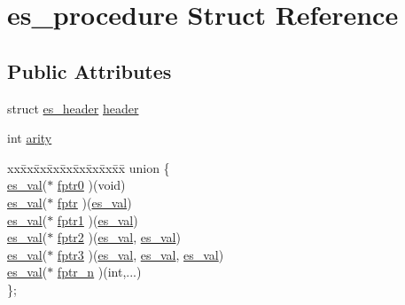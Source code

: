 \hypertarget{structes__procedure}{\section{es\-\_\-procedure Struct Reference}
\label{structes__procedure}
}
\subsection*{Public Attributes}
\begin{DoxyCompactItemize}
\item 
struct \hyperlink{structes__header}{es\-\_\-header} \hyperlink{structes__procedure_afc79bc7c13cc7e15b6314dd6d3c67b3e}{header}
\item 
int \hyperlink{structes__procedure_ade1ceee2df36b536b22cfcad392cae84}{arity}
\item 
\begin{tabbing}
xx\=xx\=xx\=xx\=xx\=xx\=xx\=xx\=xx\=\kill
union \{\\
\>\hyperlink{eva_8h_a8333c63b2093a13aab6d419c87680d7f}{es\_val}($\ast$ \hyperlink{structes__procedure_a0e0af42ca23c499c4eac0631385069e9}{fptr0} )(void)\\
\>\hyperlink{eva_8h_a8333c63b2093a13aab6d419c87680d7f}{es\_val}($\ast$ \hyperlink{structes__procedure_a8c00df37f857b9974da7971d49e2a159}{fptr} )(\hyperlink{eva_8h_a8333c63b2093a13aab6d419c87680d7f}{es\_val})\\
\>\hyperlink{eva_8h_a8333c63b2093a13aab6d419c87680d7f}{es\_val}($\ast$ \hyperlink{structes__procedure_a93510ec0977c4b1448c9ffa2f5a3e58a}{fptr1} )(\hyperlink{eva_8h_a8333c63b2093a13aab6d419c87680d7f}{es\_val})\\
\>\hyperlink{eva_8h_a8333c63b2093a13aab6d419c87680d7f}{es\_val}($\ast$ \hyperlink{structes__procedure_ac8e2043d3ff3b45a4a93dd0653fbd384}{fptr2} )(\hyperlink{eva_8h_a8333c63b2093a13aab6d419c87680d7f}{es\_val}, \hyperlink{eva_8h_a8333c63b2093a13aab6d419c87680d7f}{es\_val})\\
\>\hyperlink{eva_8h_a8333c63b2093a13aab6d419c87680d7f}{es\_val}($\ast$ \hyperlink{structes__procedure_a25b5bb2d6a44c4f17f1171d7d5019bb0}{fptr3} )(\hyperlink{eva_8h_a8333c63b2093a13aab6d419c87680d7f}{es\_val}, \hyperlink{eva_8h_a8333c63b2093a13aab6d419c87680d7f}{es\_val}, \hyperlink{eva_8h_a8333c63b2093a13aab6d419c87680d7f}{es\_val})\\
\>\hyperlink{eva_8h_a8333c63b2093a13aab6d419c87680d7f}{es\_val}($\ast$ \hyperlink{structes__procedure_a3a90709604974ef803bfbe6db292ea2b}{fptr\_n} )(int,...)\\
\}; \\

\end{tabbing}\end{DoxyCompactItemize}



